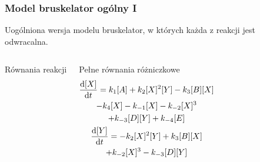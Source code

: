 \documentclass{beamer}
\begin{document}
\begin{frame}
\frametitle{Model bruskelator ogólny I}
\small Uogólniona wersja modelu bruskelator, w których każda z reakcji jest odwracalna. \normalsize
\begin{columns}
\begin{block}{Równania reakcji}
\begin{center}
	 \\
	 \\
	 \\
\end{center}
\end{block}
\begin{block}{Pełne równania różniczkowe}
\small
\begin{gather*}
	\dv{[X]}{t} = k_{1}[A] + k_{2}[X]^{2}[Y] - k_{3}[B][X] \\
	- k_{4}[X] - k_{-1}[X] - k_{-2}[X]^{3} \\
	+ k_{-3}[D][Y] + k_{-4}[E] \\
	\dv{[Y]}{t} = - k_{2}[X]^{2}[Y] + k_{3}[B][X] \\
	+ k_{-2}[X]^{3} - k_{-3}[D][Y]
\end{gather*}
\normalsize
\end{block}
\end{columns}
\end{frame}
\end{document}
